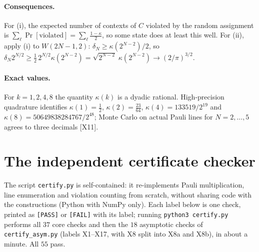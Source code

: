 \documentclass[a4paper,onecolumn,11pt,unpublished,nopdfoutputerror]{quantumarticle}
\theoremstyle{definition}
\newcommand{\cert}[1]{\textcolor{certblue}{\textsf{[#1]}}}
\newcommand{\W}[1]{W(#1,2)}
\begin{document}
\paragraph{Consequences.}
For (i), the expected number of contexts of $C$ violated by the random assignment is
$\sum_\ell\Pr[\text{violated}]=\sum_\ell\frac{1-\kappa}2$, so some state does at least this well. For (ii), apply
(i) to $\W{2N-1}$: $\delta_N\ge\kappa(2^{N-2})/2$, so
$\delta_N2^{N/2}\ge\tfrac12\,2^{N/2}\kappa(2^{N-2})=\sqrt{2^{N-2}}\;\kappa(2^{N-2})\to(2/\pi)^{3/2}$.

\paragraph{Exact values.}
For $k=1,2,4,8$ the quantity $\kappa(k)$ is a dyadic rational. High-precision quadrature identifies
$\kappa(1)=\tfrac12$, $\kappa(2)=\tfrac{23}{64}$, $\kappa(4)=133519/2^{19}$ and $\kappa(8)=50649838284767/2^{48}$;
Monte Carlo on actual Pauli lines for $N=2,\dots,5$ agrees to three decimals \cert{X11}.

\section{The independent certificate checker}\label{app:cert}
The script \texttt{certify.py} is self-contained: it re-implements Pauli multiplication, line enumeration and
violation counting from scratch, without sharing code with the constructions (Python with NumPy only). Each label
below is one check, printed as \texttt{[PASS]} or \texttt{[FAIL]} with its label; running \texttt{python3
certify.py} performs all $37$ core checks and then the $18$ asymptotic checks of \texttt{certify\_asym.py}
(labels X1--X17, with X8 split into X8a and X8b), in about a minute. All $55$ pass.
\end{document}
